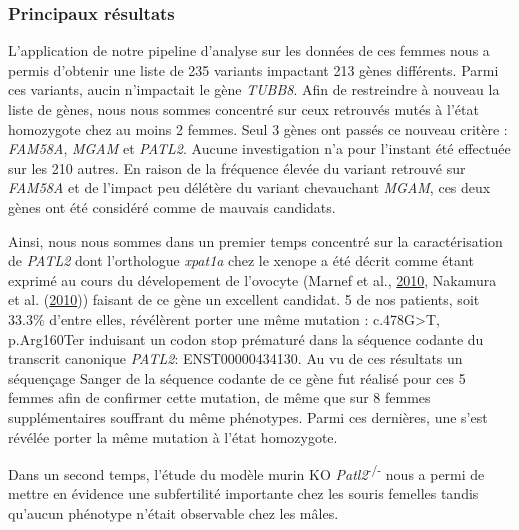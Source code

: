 \documentclass[12pt,twoside]{reedthesis}
\theoremstyle{definition}
\theoremstyle{definition}
\theoremstyle{remark}
\begin{document}
  \newpage
  
  
  
  \newpage
  
  \subsubsection{Principaux résultats}\label{principaux-resultats-3}
  
  L'application de notre pipeline d'analyse sur les données de ces femmes
  nous a permis d'obtenir une liste de 235 variants impactant 213 gènes
  différents. Parmi ces variants, aucin n'impactait le gène \emph{TUBB8}.
  Afin de restreindre à nouveau la liste de gènes, nous nous sommes
  concentré sur ceux retrouvés mutés à l'état homozygote chez au moins 2
  femmes. Seul 3 gènes ont passés ce nouveau critère : \emph{FAM58A},
  \emph{MGAM} et \emph{PATL2}. Aucune investigation n'a pour l'instant été
  effectuée sur les 210 autres. En raison de la fréquence élevée du
  variant retrouvé sur \emph{FAM58A} et de l'impact peu délétère du
  variant chevauchant \emph{MGAM}, ces deux gènes ont été considéré comme
  de mauvais candidats.
  
  Ainsi, nous nous sommes dans un premier temps concentré sur la
  caractérisation de \emph{PATL2} dont l'orthologue \emph{xpat1a} chez le
  xenope a été décrit comme étant exprimé au cours du dévelopement de
  l'ovocyte (Marnef et al., \protect\hyperlink{ref-Marnef2010}{2010},
  Nakamura et al. (\protect\hyperlink{ref-Nakamura2010}{2010})) faisant de
  ce gène un excellent candidat. 5 de nos patients, soit 33.3\% d'entre
  elles, révélèrent porter une même mutation : c.478G\textgreater{}T,
  p.Arg160Ter induisant un codon stop prématuré dans la séquence codante
  du transcrit canonique \emph{PATL2}: ENST00000434130. Au vu de ces
  résultats un séquençage Sanger de la séquence codante de ce gène fut
  réalisé pour ces 5 femmes afin de confirmer cette mutation, de même que
  sur 8 femmes supplémentaires souffrant du même phénotypes. Parmi ces
  dernières, une s'est révélée porter la même mutation à l'état
  homozygote.
  
  Dans un second temps, l'étude du modèle murin KO
  \emph{Patl2}\textsuperscript{-/-} nous a permi de mettre en évidence une
  subfertilité importante chez les souris femelles tandis qu'aucun
  phénotype n'était observable chez les mâles.
  
\end{document}
